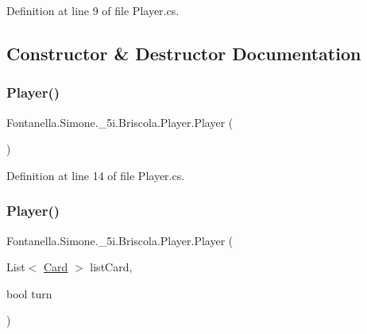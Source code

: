 Definition at line 9 of file Player.\+cs.



\subsection{Constructor \& Destructor Documentation}
\hypertarget{class_fontanella_1_1_simone_1_1__5i_1_1_briscola_1_1_player_aa805663430170d74db67e3f900c14715}{}\label{class_fontanella_1_1_simone_1_1__5i_1_1_briscola_1_1_player_aa805663430170d74db67e3f900c14715} 
\subsubsection{\texorpdfstring{Player()}{Player()}\hspace{0.1cm}{\footnotesize\ttfamily [1/2]}}
{\footnotesize\ttfamily Fontanella.\+Simone.\+\_\+5i.\+Briscola.\+Player.\+Player (\begin{DoxyParamCaption}{ }\end{DoxyParamCaption})}



Definition at line 14 of file Player.\+cs.

\hypertarget{class_fontanella_1_1_simone_1_1__5i_1_1_briscola_1_1_player_aef3390197ac09b8e799c3144c0a33bb6}{}\label{class_fontanella_1_1_simone_1_1__5i_1_1_briscola_1_1_player_aef3390197ac09b8e799c3144c0a33bb6} 
\subsubsection{\texorpdfstring{Player()}{Player()}\hspace{0.1cm}{\footnotesize\ttfamily [2/2]}}
{\footnotesize\ttfamily Fontanella.\+Simone.\+\_\+5i.\+Briscola.\+Player.\+Player (\begin{DoxyParamCaption}\item[{List$<$ \hyperlink{class_fontanella_1_1_simone_1_1__5i_1_1_briscola_1_1_card}{Card} $>$}]{list\+Card,  }\item[{bool}]{turn }\end{DoxyParamCaption})}



